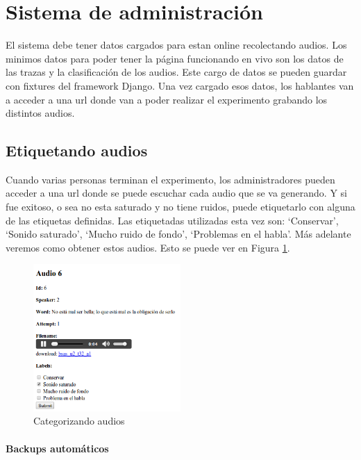 \documentclass[11pt,a4paper,twoside]{tesis}
\begin{document}
\section{Sistema de administración}

El sistema debe tener datos cargados para estan online recolectando audios. Los minimos datos para poder tener la página funcionando en vivo son los datos de las trazas y la clasificación de los audios. Este cargo de datos se pueden guardar con fixtures del framework Django. Una vez cargado esos datos, los hablantes van a acceder a una url donde van a poder realizar el experimento grabando los distintos audios.

\subsection{Etiquetando audios}

Cuando varias personas terminan el experimento, los administradores pueden acceder a una url donde se puede escuchar cada audio que se va generando. Y si fue exitoso, o sea no esta saturado y no tiene ruidos, puede etiquetarlo con alguna de las etiquetas definidas. Las etiquetadas utilizadas esta vez son: ‘Conservar’,  ‘Sonido saturado’, ‘Mucho ruido de fondo’, ‘Problemas en el habla’. Más adelante veremos como obtener estos audios. Esto se puede ver en Figura \ref{cat}.

\begin{figure}[h!]
    \centerline{\includegraphics[width=0.5\textwidth]{categorizando_audios} }
    \caption{Categorizando audios}
    \label{cat}
\end{figure}

\paragraph{Backups automáticos}
\end{document}
